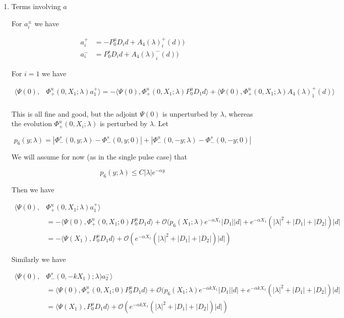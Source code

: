 \documentclass[12pt]{article}
\begin{document}
\begin{enumerate}
\item Terms involving $a$

For $a_i^\pm$ we have

\begin{align*}
a_i^+ &= -P^u_0 D_i d + A_4(\lambda)_i^+(d))\\
a_i^- &=  P^s_0 D_i d + A_4(\lambda)_i^-(d))
\end{align*}

For $i = 1$ we have

\begin{align*}
\langle \Psi(0), &\Phi^u_+(0, X_1; \lambda) a_1^+ \rangle = -\langle \Psi(0), \Phi^u_+(0, X_1; \lambda) P^u_0 D_1 d \rangle + \langle \Psi(0), \Phi^u_+(0, X_1; \lambda) A_4(\lambda)_1^+(d) \rangle \\
\end{align*} 

This is all fine and good, but the adjoint $\Psi(0)$ is unperturbed by $\lambda$, whereas the evolution $\Phi^u_+(0, X_i; \lambda)$ is perturbed by $\lambda$. Let

\[
p_6(y; \lambda) = |\Phi^s_-(0, y; \lambda) - \Phi^s_-(0, y; 0)| + |\Phi^u_-(0, -y; \lambda) - \Phi^s_-(0, -y; 0)| 
\]

We will assume for now (as in the single pulse case) that

\[
p_6(y; \lambda) \leq C |\lambda| e^{-\alpha y}
\]

Then we have

\begin{align*}
\langle \Psi(0), &\Phi^u_+(0, X_1; \lambda) a_1^+ \rangle \\
&= -\langle \Psi(0), \Phi^u_+(0, X_1; 0) P^u_0 D_1 d \rangle + \mathcal{O}( p_6(X_1; \lambda) e^{-\alpha X_1}|D_1||d| + e^{-\alpha X_1} (|\lambda|^2 + |D_1| + |D_2| )|d| \\
&= -\langle \Psi(X_1), P^u_0 D_1 d \rangle + \mathcal{O}( e^{-\alpha X_1}( |\lambda|^2 + |D_1| + |D_2|)|d|)
\end{align*}

Similarly we have

\begin{align*}
\langle \Psi(0), &\Phi^s_-(0, -k X_1); \lambda)a_2^- \rangle \\
&= \langle \Psi(0), \Phi^u_+(0, X_1; 0) P^u_0 D_1 d \rangle + \mathcal{O}( p_6(X_1; \lambda) e^{-\alpha k X_1}|D_1||d| + e^{-\alpha k X_1} (|\lambda|^2 + |D_1| + |D_2| )|d| \\
&= \langle \Psi(X_1), P^u_0 D_1 d \rangle + \mathcal{O}( e^{-\alpha k X_1}( |\lambda|^2 + |D_1| + |D_2|)|d|)
\end{align*}



\end{enumerate}
\end{document}
